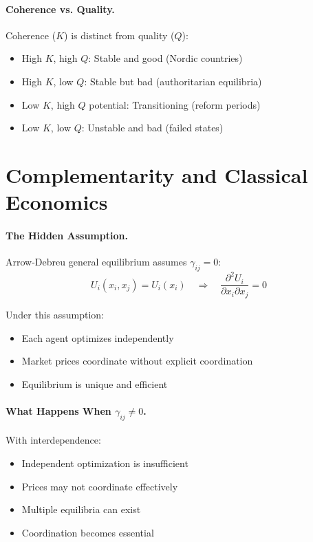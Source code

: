 \paragraph{Coherence vs. Quality.}
Coherence ($K$) is distinct from quality ($Q$):
\begin{itemize}[nosep]
  \item High $K$, high $Q$: Stable and good (Nordic countries)
  \item High $K$, low $Q$: Stable but bad (authoritarian equilibria)
  \item Low $K$, high $Q$ potential: Transitioning (reform periods)
  \item Low $K$, low $Q$: Unstable and bad (failed states)
\end{itemize}



\section{Complementarity and Classical Economics}
\label{sec:comp-classical}


\paragraph{The Hidden Assumption.}
Arrow-Debreu general equilibrium assumes $\gamma_{ij} = 0$:
\begin{equation}
  U_i(x_i, x_j) = U_i(x_i) \quad \Rightarrow \quad \frac{\partial^2 U_i}{\partial x_i \partial x_j} = 0
\end{equation}

Under this assumption:
\begin{itemize}[nosep]
  \item Each agent optimizes independently
  \item Market prices coordinate without explicit coordination
  \item Equilibrium is unique and efficient
\end{itemize}

\paragraph{What Happens When $\gamma_{ij} \neq 0$.}
With interdependence:
\begin{itemize}[nosep]
  \item Independent optimization is insufficient
  \item Prices may not coordinate effectively
  \item Multiple equilibria can exist
  \item Coordination becomes essential
\end{itemize}

